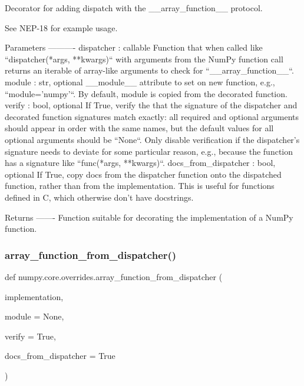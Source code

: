 \begin{DoxyVerb}Decorator for adding dispatch with the __array_function__ protocol.

See NEP-18 for example usage.

Parameters
----------
dispatcher : callable
    Function that when called like ``dispatcher(*args, **kwargs)`` with
    arguments from the NumPy function call returns an iterable of
    array-like arguments to check for ``__array_function__``.
module : str, optional
    __module__ attribute to set on new function, e.g., ``module='numpy'``.
    By default, module is copied from the decorated function.
verify : bool, optional
    If True, verify the that the signature of the dispatcher and decorated
    function signatures match exactly: all required and optional arguments
    should appear in order with the same names, but the default values for
    all optional arguments should be ``None``. Only disable verification
    if the dispatcher's signature needs to deviate for some particular
    reason, e.g., because the function has a signature like
    ``func(*args, **kwargs)``.
docs_from_dispatcher : bool, optional
    If True, copy docs from the dispatcher function onto the dispatched
    function, rather than from the implementation. This is useful for
    functions defined in C, which otherwise don't have docstrings.

Returns
-------
Function suitable for decorating the implementation of a NumPy function.
\end{DoxyVerb}
 \mbox{\label{namespacenumpy_1_1core_1_1overrides_a6eac64f23de359be7b5239e457ce253c}} 
\subsubsection{\texorpdfstring{array\+\_\+function\+\_\+from\+\_\+dispatcher()}{array\_function\_from\_dispatcher()}}
{\footnotesize\ttfamily def numpy.\+core.\+overrides.\+array\+\_\+function\+\_\+from\+\_\+dispatcher (\begin{DoxyParamCaption}\item[{}]{implementation,  }\item[{}]{module = {\ttfamily None},  }\item[{}]{verify = {\ttfamily True},  }\item[{}]{docs\+\_\+from\+\_\+dispatcher = {\ttfamily True} }\end{DoxyParamCaption})}

